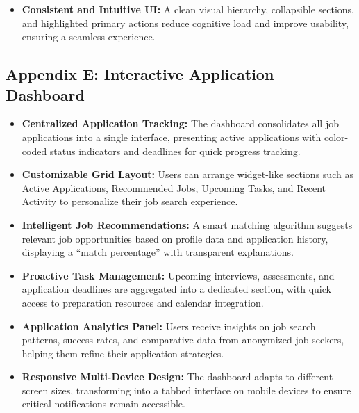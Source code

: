\documentclass[
	letterpaper, %
]{jdf}
\begin{document}
\begin{sloppypar}
\begin{itemize}
    \item \textbf{Consistent and Intuitive UI:} A clean visual hierarchy, collapsible sections, and highlighted primary actions reduce cognitive load and improve usability, ensuring a seamless experience.
\end{itemize}

\hfill \break
\subsection{Appendix E: Interactive Application Dashboard}
\begin{itemize}
    \item \textbf{Centralized Application Tracking:} The dashboard consolidates all job applications into a single interface, presenting active applications with color-coded status indicators and deadlines for quick progress tracking.
    
    \item \textbf{Customizable Grid Layout:} Users can arrange widget-like sections such as Active Applications, Recommended Jobs, Upcoming Tasks, and Recent Activity to personalize their job search experience.
    
    \item \textbf{Intelligent Job Recommendations:} A smart matching algorithm suggests relevant job opportunities based on profile data and application history, displaying a “match percentage” with transparent explanations.
    
    \item \textbf{Proactive Task Management:} Upcoming interviews, assessments, and application deadlines are aggregated into a dedicated section, with quick access to preparation resources and calendar integration.
    
    \item \textbf{Application Analytics Panel:} Users receive insights on job search patterns, success rates, and comparative data from anonymized job seekers, helping them refine their application strategies.
    
    \item \textbf{Responsive Multi-Device Design:} The dashboard adapts to different screen sizes, transforming into a tabbed interface on mobile devices to ensure critical notifications remain accessible.
\end{itemize}

\hfill \break

\end{sloppypar}
\end{document}

